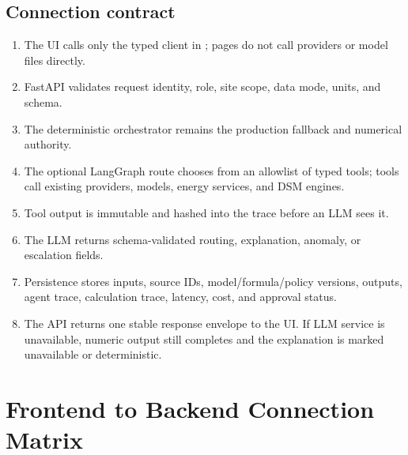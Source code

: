 \subsection{Connection contract}

\begin{enumerate}
  \item The UI calls only the typed client in ; pages do not call
        providers or model files directly.
  \item FastAPI validates request identity, role, site scope, data mode, units, and schema.
  \item The deterministic orchestrator remains the production fallback and numerical authority.
  \item The optional LangGraph route chooses from an allowlist of typed tools; tools call existing
        providers, models, energy services, and DSM engines.
  \item Tool output is immutable and hashed into the trace before an LLM sees it.
  \item The LLM returns schema-validated routing, explanation, anomaly, or escalation fields.
  \item Persistence stores inputs, source IDs, model/formula/policy versions, outputs, agent trace,
        calculation trace, latency, cost, and approval status.
  \item The API returns one stable response envelope to the UI. If LLM service is unavailable,
        numeric output still completes and the explanation is marked unavailable or deterministic.
\end{enumerate}

\section{Frontend to Backend Connection Matrix}

